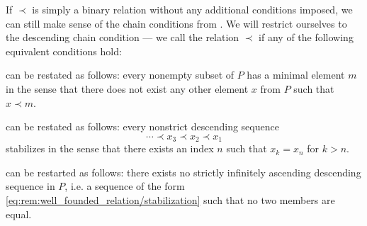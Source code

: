 \begin{remark}\label{rem:well_founded_relation}
  If \( \prec \) is simply a binary relation without any additional conditions imposed, we can still make sense of the chain conditions from . We will restrict ourselves to the descending chain condition --- we call the relation \( \prec \)  if any of the following equivalent conditions hold:

  \begin{thmenum}
      can be restated as follows: every nonempty subset of \( P \) has a minimal element \( m \) in the sense that there does not exist any other element \( x \) from \( P \) such that \( x \prec m \).

      can be restated as follows: every nonstrict descending sequence
    \begin{equation}\label{eq:rem:well_founded_relation/stabilization}
      \cdots \prec x_3 \prec x_2 \prec x_1
    \end{equation}
    stabilizes in the sense that there exists an index \( n \) such that \( x_k = x_n \) for \( k > n \).

      can be restarted as follows: there exists no strictly infinitely ascending descending sequence in \( P \), i.e. a sequence of the form \eqref{eq:rem:well_founded_relation/stabilization} such that no two members are equal.
  \end{thmenum}
\end{remark}

